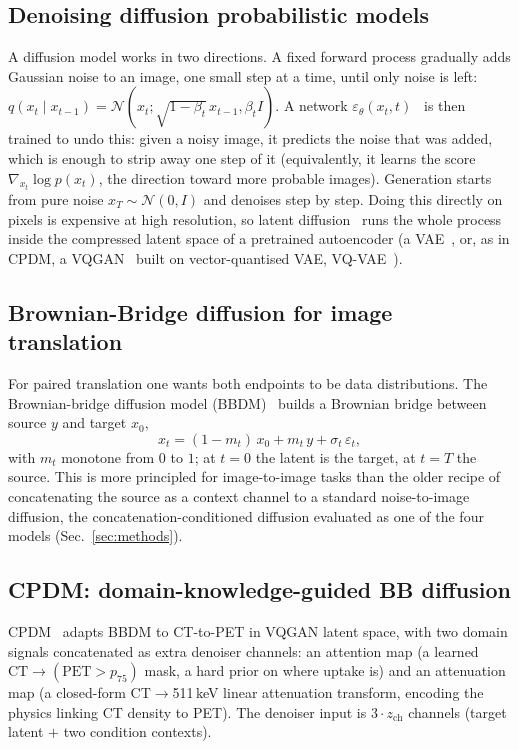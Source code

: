 \documentclass[11pt,a4paper]{article}
\begin{document}
\subsection{Denoising diffusion probabilistic models}
A diffusion model works in two directions. A fixed forward process gradually adds Gaussian
noise to an image, one small step at a time, until only noise is left:
$q(x_t \mid x_{t-1}) = \mathcal{N}(x_t; \sqrt{1-\beta_t}\,x_{t-1}, \beta_t I)$. A network
$\varepsilon_\theta(x_t,t)$~\parencite{sohldickstein2015deep, ho2020denoising, song2021scorebased}
is then trained to undo this: given a noisy image, it predicts the noise that was added, which is
enough to strip away one step of it (equivalently, it learns the score
$\nabla_{x_t}\log p(x_t)$, the direction toward more probable images). Generation starts from pure
noise $x_T\sim\mathcal{N}(0,I)$ and denoises step by step. Doing this directly on pixels is
expensive at high resolution, so latent diffusion~\parencite{rombach2022ldm} runs the whole
process inside the compressed latent space of a pretrained autoencoder (a
VAE~\parencite{kingma2014vae}, or, as in CPDM, a VQGAN~\parencite{esser2021vqgan} built on
vector-quantised VAE, VQ-VAE~\parencite{oord2017vqvae}).

\subsection{Brownian-Bridge diffusion for image translation}
\label{sec:bbdm}
For paired translation one wants both endpoints to be data distributions.
The Brownian-bridge diffusion model (BBDM)~\parencite{li2023bbdm} builds a Brownian bridge between source $y$ and target
$x_0$,
\begin{equation}
x_t = (1-m_t)\,x_0 + m_t\,y + \sigma_t\,\varepsilon_t,
\label{eq:bbdm}
\end{equation}
with $m_t$ monotone from $0$ to $1$; at $t{=}0$ the latent is the target, at $t{=}T$
the source. This is more principled for image-to-image tasks than the older recipe
of concatenating the source as a context channel to a standard noise-to-image
diffusion, the concatenation-conditioned diffusion evaluated as one of the four models
(Sec.~\ref{sec:methods}).

\subsection{CPDM: domain-knowledge-guided BB diffusion}
\label{sec:cpdm-theory}
CPDM~\parencite{nguyen2025cpdm} adapts BBDM to CT-to-PET in VQGAN latent space, with
two domain signals concatenated as extra denoiser channels: an attention map
(a learned $\text{CT}\!\to\!(\text{PET}>p_{75})$ mask, a hard prior on where
uptake is) and an attenuation map (a closed-form CT$\to$511\,keV linear
attenuation transform, encoding the physics linking CT density to PET). The denoiser
input is $3\cdot z_{\text{ch}}$ channels (target latent $+$ two condition contexts).
\end{document}
